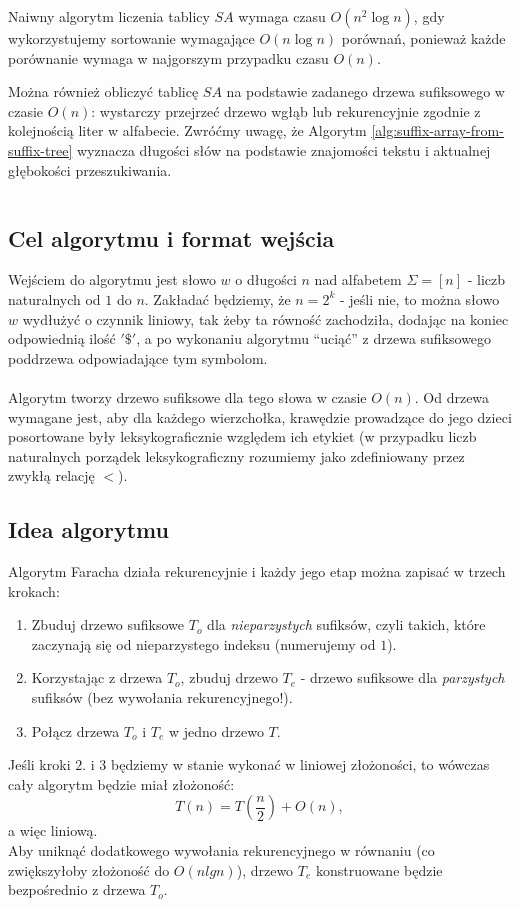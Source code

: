 Naiwny algorytm liczenia tablicy $SA$ wymaga czasu $O(n^2 \log{n})$, gdy wykorzystujemy sortowanie wymagające $O(n \log{n})$ porównań, ponieważ każde porównanie wymaga w najgorszym przypadku czasu $O(n)$.

Można również obliczyć tablicę $SA$ na podstawie zadanego drzewa sufiksowego w czasie $O(n)$: wystarczy przejrzeć drzewo wgłąb lub rekurencyjnie zgodnie z kolejnością liter w alfabecie. Zwróćmy uwagę, że Algorytm \ref{alg:suffix-array-from-suffix-tree} wyznacza długości słów na podstawie znajomości tekstu i aktualnej głębokości przeszukiwania.

\begin{code}
\inputminted{python}{code/suffix-array/from-suffix-tree.py}
\label{alg:suffix-array-from-suffix-tree}
\end{code}


    \subsection{Cel algorytmu i format wejścia}
    Wejściem do algorytmu jest słowo $w$ o długości $n$ nad alfabetem $\Sigma = [n]$ - liczb naturalnych od $1$ do $n$. Zakładać będziemy, że $n = 2^k$ - jeśli nie, to można słowo $w$ wydłużyć o czynnik liniowy, tak żeby ta równość zachodziła, dodając na koniec odpowiednią ilość $'\$'$, a po wykonaniu algorytmu ``uciąć'' z drzewa sufiksowego poddrzewa odpowiadające tym symbolom. \\ \\
    Algorytm tworzy drzewo sufiksowe dla tego słowa w czasie $O(n)$. Od drzewa wymagane jest, aby dla każdego wierzchołka, krawędzie prowadzące do jego dzieci posortowane były leksykograficznie względem ich etykiet (w przypadku liczb naturalnych porządek leksykograficzny rozumiemy jako zdefiniowany przez zwykłą relację $<$).
    
    \subsection{Idea algorytmu}
    Algorytm Faracha działa rekurencyjnie i każdy jego etap można zapisać w trzech krokach:
    \begin{enumerate}
     \item Zbuduj drzewo sufiksowe $T_o$ dla \textit{nieparzystych} sufiksów, czyli takich, które zaczynają się od nieparzystego indeksu (numerujemy od $1$).
     \item Korzystając z drzewa $T_o$, zbuduj drzewo $T_e$ - drzewo sufiksowe dla \textit{parzystych} sufiksów (bez wywołania rekurencyjnego!).
     \item Połącz drzewa $T_o$ i $T_e$ w jedno drzewo $T$.
    \end{enumerate}
    Jeśli kroki $2.$ i $3$ będziemy w stanie wykonać w liniowej złożoności, to wówczas cały algorytm będzie miał złożoność:
    $$
        T(n) = T\left(\frac{n}{2}\right) + O(n),
    $$
    a więc liniową. \\
    Aby  uniknąć dodatkowego wywołania rekurencyjnego w równaniu (co zwiększyłoby złożoność do $O(nlgn)$), drzewo $T_e$ konstruowane będzie bezpośrednio z drzewa $T_o$.
    
